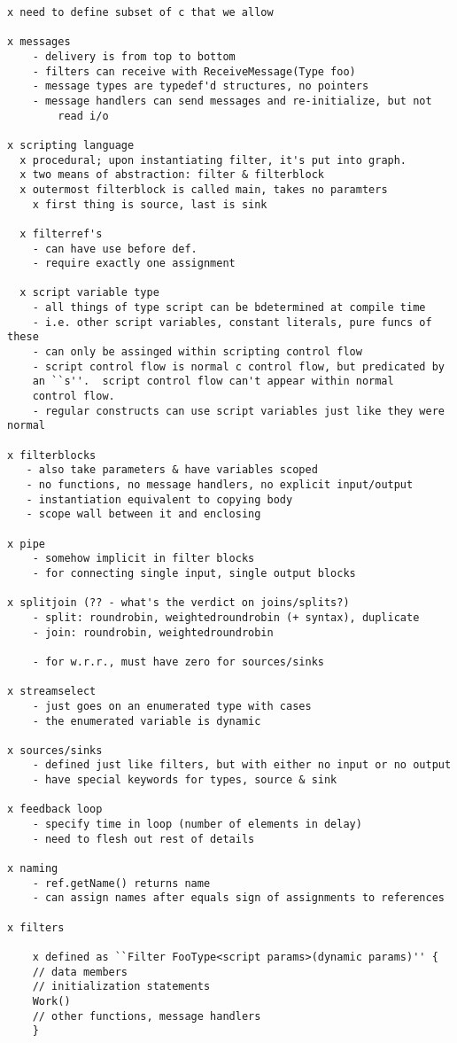 \documentclass[draft]{article}
\begin{document}
\begin{verbatim}
x need to define subset of c that we allow

x messages
	- delivery is from top to bottom
	- filters can receive with ReceiveMessage(Type foo)
	- message types are typedef'd structures, no pointers
	- message handlers can send messages and re-initialize, but not
		read i/o

x scripting language
  x procedural; upon instantiating filter, it's put into graph.
  x two means of abstraction: filter & filterblock
  x outermost filterblock is called main, takes no paramters
	x first thing is source, last is sink

  x filterref's
    - can have use before def.
    - require exactly one assignment

  x script variable type
    - all things of type script can be bdetermined at compile time
    - i.e. other script variables, constant literals, pure funcs of these
    - can only be assinged within scripting control flow
    - script control flow is normal c control flow, but predicated by
	an ``s''.  script control flow can't appear within normal 
	control flow.
    - regular constructs can use script variables just like they were normal

x filterblocks
   - also take parameters & have variables scoped
   - no functions, no message handlers, no explicit input/output
   - instantiation equivalent to copying body
   - scope wall between it and enclosing

x pipe
	- somehow implicit in filter blocks
	- for connecting single input, single output blocks

x splitjoin (?? - what's the verdict on joins/splits?)
	- split: roundrobin, weightedroundrobin (+ syntax), duplicate
	- join: roundrobin, weightedroundrobin

	- for w.r.r., must have zero for sources/sinks

x streamselect
	- just goes on an enumerated type with cases
	- the enumerated variable is dynamic

x sources/sinks
	- defined just like filters, but with either no input or no output
	- have special keywords for types, source & sink

x feedback loop
	- specify time in loop (number of elements in delay)
	- need to flesh out rest of details

x naming
	- ref.getName() returns name
	- can assign names after equals sign of assignments to references

x filters 

    x defined as ``Filter FooType<script params>(dynamic params)'' {
	// data members
	// initialization statements
	Work()
	// other functions, message handlers
	}


\end{verbatim}
\end{document}

